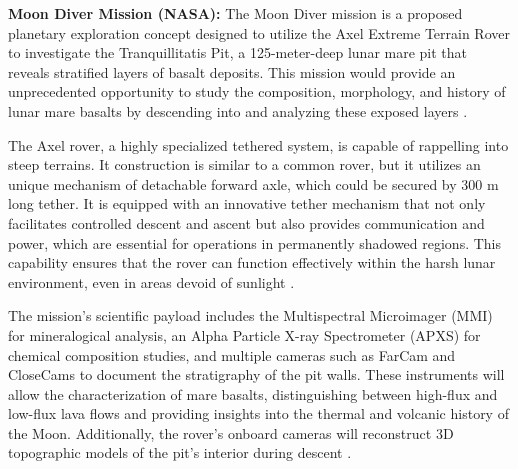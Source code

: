 \textbf{Moon Diver Mission (NASA):} 
The Moon Diver mission is a proposed planetary exploration concept designed to utilize the Axel Extreme Terrain Rover to investigate the Tranquillitatis Pit, a 125-meter-deep lunar mare pit that reveals stratified layers of basalt deposits. This mission would provide an unprecedented opportunity to study the composition, morphology, and history of lunar mare basalts by descending into and analyzing these exposed layers \cite{kerber2023,kerber2016}.

The Axel rover, a highly specialized tethered system, is capable of rappelling into steep terrains. It construction is similar to a common rover, but it utilizes an unique mechanism of detachable forward axle, which could be secured by 300 m long tether. It is equipped with an innovative tether mechanism that not only facilitates controlled descent and ascent but also provides communication and power, which are essential for operations in permanently shadowed regions. This capability ensures that the rover can function effectively within the harsh lunar environment, even in areas devoid of sunlight \cite{kerber2016}.

The mission's scientific payload includes the Multispectral Microimager (MMI) for mineralogical analysis, an Alpha Particle X-ray Spectrometer (APXS) for chemical composition studies, and multiple cameras such as FarCam and CloseCams to document the stratigraphy of the pit walls. These instruments will allow the characterization of mare basalts, distinguishing between high-flux and low-flux lava flows and providing insights into the thermal and volcanic history of the Moon. Additionally, the rover’s onboard cameras will reconstruct 3D topographic models of the pit's interior during descent \cite{kerber2023,kerber2016}.


